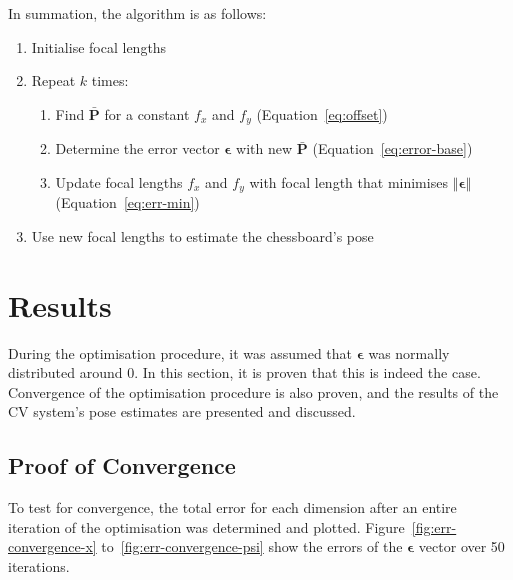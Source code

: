 In summation, the algorithm is as follows:

\begin{enumerate}
  \item Initialise focal lengths
  \item Repeat $k$ times:
  \begin{enumerate}
    \item Find $\bar{\bm{P}}$ for a constant $f_x$ and $f_y$ (Equation~\ref{eq:offset})
    \item Determine the error vector $\bm{\epsilon}$ with new $\bar{\bm{P}}$ (Equation~\ref{eq:error-base})
    \item Update focal lengths $f_x$ and $f_y$ with focal length that minimises $\left \Vert \bm{\epsilon} \right \Vert$ (Equation~\ref{eq:err-min})
  \end{enumerate}
  \item Use new focal lengths to estimate the chessboard's pose
\end{enumerate}

\section{Results}

During the optimisation procedure, it was assumed that $\bm{\epsilon}$ was normally distributed around 0. In this section, it is proven that this is indeed the case. Convergence of the optimisation procedure is also proven, and the results of the CV system's pose estimates are presented and discussed.

\subsection{Proof of Convergence}

To test for convergence, the total error for each dimension after an entire iteration of the optimisation was determined and plotted. Figure~\ref{fig:err-convergence-x} to~\ref{fig:err-convergence-psi} show the errors of the $\bm{\epsilon}$ vector over 50 iterations.

